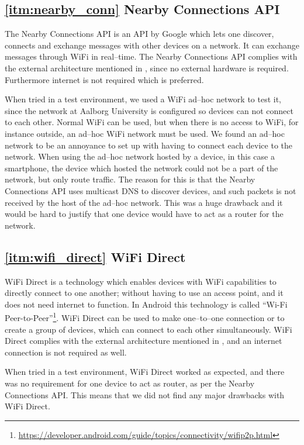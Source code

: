 \subsection*{\ref{itm:nearby_conn} Nearby Connections API}
The Nearby Connections API is an API by Google which lets one discover, connects and exchange messages with other devices on a network.
It can exchange messages through WiFi in real--time.\cite{nearby_connection}
The Nearby Connections API complies with the external architecture mentioned in ,
since no external hardware is required.
Furthermore internet is not required which is preferred.

When tried in a test environment, we used a WiFi ad--hoc network to test it,
since the network at Aalborg University is configured so devices can not connect to each other.
Normal WiFi can be used, but when there is no access to WiFi, for instance outside, an ad--hoc WiFi network must be used.
We found an ad--hoc network to be an annoyance to set up with having to connect each device to the network.
When using the ad--hoc network hosted by a device, in this case a smartphone,
the device which hosted the network could not be a part of the network, but only route traffic.
The reason for this is that the Nearby Connections API uses multicast DNS to discover devices,
and such packets is not received by the host of the ad--hoc network.
This was a huge drawback and it would be hard to justify that one device would have to act as a router for the network.

\subsection*{\ref{itm:wifi_direct} WiFi Direct}
WiFi Direct is a technology which enables devices with WiFi capabilities to directly connect to one another;
without having to use an access point, and it does not need internet to function.
In Android this technology is called ``Wi-Fi Peer-to-Peer''\footnote{\url{https://developer.android.com/guide/topics/connectivity/wifip2p.html}}.
WiFi Direct can be used to make one--to--one connection or to create a group of devices,
which can connect to each other simultaneously.\cite{wifi_direct}
WiFi Direct complies with the external architecture mentioned in , and an internet connection is not required as well.

When tried in a test environment, WiFi Direct worked as expected,
and there was no requirement for one device to act as router, as per the Nearby Connections API.
This means that we did not find any major drawbacks with WiFi Direct.

